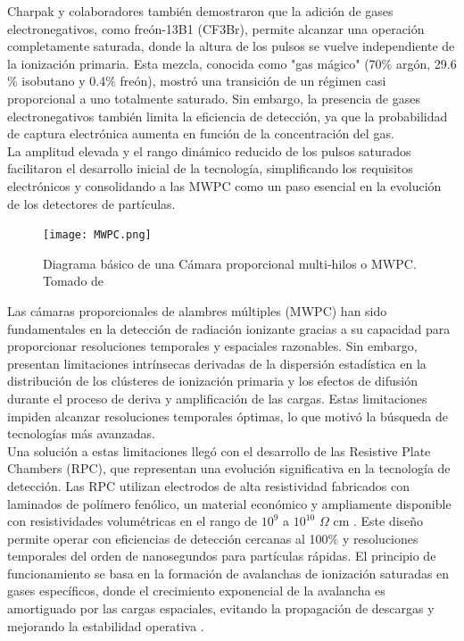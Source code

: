 \documentclass{article}
\begin{document}
\noindent Charpak y colaboradores \cite{charpak1974high} también demostraron que la adición de gases electronegativos, como freón-13B1 (CF3Br), permite alcanzar una operación completamente saturada, donde la altura de los pulsos se vuelve independiente de la ionización primaria. Esta mezcla, conocida como "gas mágico" (70$\%$ argón, 29.6$\%$ isobutano y 0.4$\%$ freón), mostró una transición de un régimen casi proporcional a uno totalmente saturado. Sin embargo, la presencia de gases electronegativos también limita la eficiencia de detección, ya que la probabilidad de captura electrónica aumenta en función de la concentración del gas.\\

\noindent La amplitud elevada y el rango dinámico reducido de los pulsos saturados facilitaron el desarrollo inicial de la tecnología, simplificando los requisitos electrónicos y consolidando a las MWPC como un paso esencial en la evolución de los detectores de partículas.\\

\begin{figure}[H]
    \centering
    \texttt{[image: MWPC.png]}
    \caption{Diagrama básico de una Cámara proporcional multi-hilos o MWPC. Tomado de \cite{hamid2013micromegas}}
    \label{fig:MWPC}
\end{figure}

\noindent Las cámaras proporcionales de alambres múltiples (MWPC) han sido fundamentales en la detección de radiación ionizante gracias a su capacidad para proporcionar resoluciones temporales y espaciales razonables. Sin embargo, presentan limitaciones intrínsecas derivadas de la dispersión estadística en la distribución de los clústeres de ionización primaria y los efectos de difusión durante el proceso de deriva y amplificación de las cargas. Estas limitaciones impiden alcanzar resoluciones temporales óptimas, lo que motivó la búsqueda de tecnologías más avanzadas. \\

\noindent Una solución a estas limitaciones llegó con el desarrollo de las Resistive Plate Chambers (RPC), que representan una evolución significativa en la tecnología de detección. Las RPC utilizan electrodos de alta resistividad fabricados con laminados de polímero fenólico, un material económico y ampliamente disponible con resistividades volumétricas en el rango de $10^9$ a $10^{10}$ $\Omega$ cm \cite{pestov2002review}. Este diseño permite operar con eficiencias de detección cercanas al 100$\%$ y resoluciones temporales del orden de nanosegundos para partículas rápidas. El principio de funcionamiento se basa en la formación de avalanchas de ionización saturadas en gases específicos, donde el crecimiento exponencial de la avalancha es amortiguado por las cargas espaciales, evitando la propagación de descargas y mejorando la estabilidad operativa \cite{pestov2002review}. \\
\end{document}
